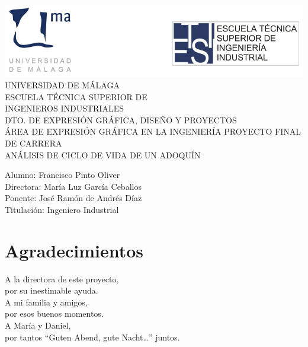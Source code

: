 \documentclass[12pt,titlepage,openright]{report}
\begin{document}
\renewcommand\listtablename{Índice de tablas}
\renewcommand\tablename{Tabla}

\begin{titlepage}
\begin{center}
{\centering \includegraphics{portada.png}}
\vfill
{\LARGE UNIVERSIDAD DE MÁLAGA\\
ESCUELA TÉCNICA SUPERIOR DE\\[10pt]
INGENIEROS INDUSTRIALES}\\[25pt]
{\large DTO. DE EXPRESIÓN GRÁFICA, DISEÑO Y PROYECTOS\\
ÁREA DE EXPRESIÓN GRÁFICA EN LA INGENIERÍA}
\vfill
{\Large PROYECTO FINAL DE CARRERA\\[10pt]
ANÁLISIS DE CICLO DE VIDA DE UN ADOQUÍN}
\end{center}
\vfill
\begin{flushright}
Alumno: Francisco Pinto Oliver\\
Directora: María Luz García Ceballos\\
Ponente: José Ramón de Andrés Díaz\\
Titulación: Ingeniero Industrial
\end{flushright}
\end{titlepage}

 \tableofcontents \newpage \listoffigures
\newpage \listoftables

\newpage
{}

\chapter*{Agradecimientos}
\begin{flushright}
A la directora de este proyecto,\\por su inestimable ayuda.\\[10pt]
A mi familia y amigos,\\por esos buenos momentos.\\[10pt]
A María y Daniel,\\por tantos ``Guten Abend, gute Nacht\ldots'' juntos.
\end{flushright}
\vfill
\end{document}
